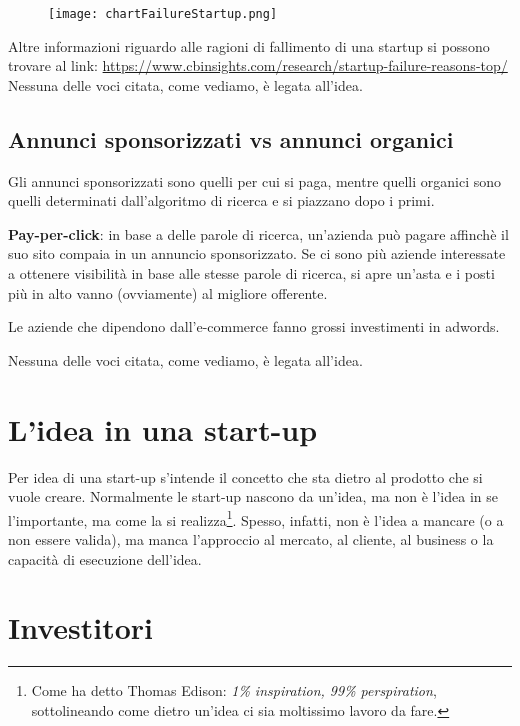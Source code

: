 \begin{figure}[H]
\texttt{[image: chartFailureStartup.png]}
\end{figure}

Altre informazioni riguardo alle ragioni di fallimento di una startup si possono
trovare al link: \url{https://www.cbinsights.com/research/startup-failure-reasons-top/}
Nessuna delle voci citata, come vediamo, è legata all'idea.

\subsection{Annunci sponsorizzati vs annunci organici}

Gli annunci sponsorizzati sono quelli per cui si paga, mentre quelli organici sono
quelli determinati dall'algoritmo di ricerca e si piazzano dopo i primi.

\textbf{Pay-per-click}: in base a delle parole di ricerca, un'azienda può pagare
affinchè il suo sito compaia in un annuncio sponsorizzato. Se ci sono più aziende
interessate a ottenere visibilità in base alle stesse parole di ricerca, si apre
un'asta e i posti più in alto vanno (ovviamente) al migliore offerente.

Le aziende che dipendono dall'e-commerce fanno grossi investimenti in adwords.

Nessuna delle voci citata, come vediamo, è legata all'idea.


\section{L'idea in una start-up}

Per idea di una start-up s'intende il concetto che sta dietro al prodotto che
si vuole creare. Normalmente le start-up nascono da un'idea, ma non è l'idea in
se l'importante, ma come la si realizza\footnote{Come ha detto Thomas Edison:
\emph{1\% inspiration, 99\% perspiration}, sottolineando come dietro un'idea
ci sia moltissimo lavoro da fare.}. Spesso, infatti, non è l'idea a mancare
(o a non essere valida), ma manca l'approccio al mercato, al cliente, al 
business o la capacità di esecuzione dell'idea.

\section{Investitori}


